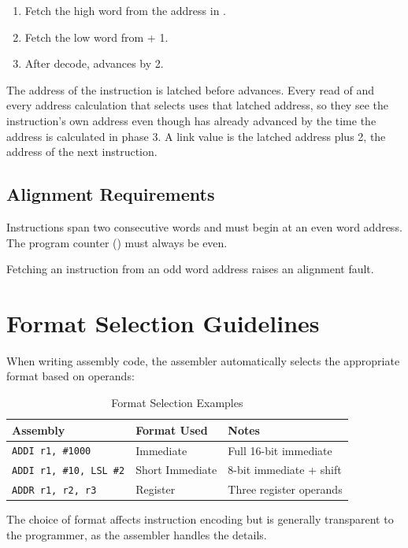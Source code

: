 \begin{enumerate}
	\item Fetch the high word from the address in .
	\item Fetch the low word from  + 1.
	\item After decode,  advances by 2.
\end{enumerate}

The address of the instruction is latched before  advances. Every read of  and every address calculation
that selects  uses that latched address, so they see the instruction's own address even though  has
already advanced by the time the address is calculated in phase 3. A link value is the latched address plus 2, the
address of the next instruction.

\subsection{Alignment Requirements}

Instructions span two consecutive words and must begin at an even word address. The program counter () must
always be even.

Fetching an instruction from an odd word address raises an alignment fault.

\section{Format Selection Guidelines}

When writing assembly code, the assembler automatically selects the appropriate format based on operands:

\begin{table}[H]
	\centering
	\small
	\begin{tabular}{lll}
		\toprule
		\textbf{Assembly}               & \textbf{Format Used} & \textbf{Notes}          \\
		\midrule
		\texttt{ADDI r1, \#1000}        & Immediate            & Full 16-bit immediate   \\
		\texttt{ADDI r1, \#10, LSL \#2} & Short Immediate      & 8-bit immediate + shift \\
		\texttt{ADDR r1, r2, r3}        & Register             & Three register operands \\
		\bottomrule
	\end{tabular}
	\caption{Format Selection Examples}
	\label{tab:format-selection}
\end{table}

The choice of format affects instruction encoding but is generally transparent to the programmer, as the assembler
handles the details.
